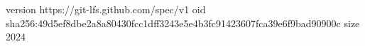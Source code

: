 version https://git-lfs.github.com/spec/v1
oid sha256:49d5ef8dbe2a8a80430fcc1dff3243e5e4b3fc91423607fca39e6f9bad90900c
size 2024
